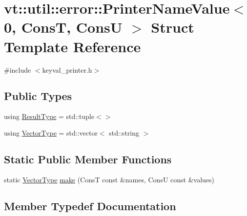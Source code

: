 \hypertarget{structvt_1_1util_1_1error_1_1_printer_name_value_3_010_00_01_cons_t_00_01_cons_u_01_4}{}\section{vt\+:\+:util\+:\+:error\+:\+:Printer\+Name\+Value$<$ 0, ConsT, ConsU $>$ Struct Template Reference}
\label{structvt_1_1util_1_1error_1_1_printer_name_value_3_010_00_01_cons_t_00_01_cons_u_01_4}


{\ttfamily \#include $<$keyval\+\_\+printer.\+h$>$}

\subsection*{Public Types}
\begin{DoxyCompactItemize}
\item 
using \hyperlink{structvt_1_1util_1_1error_1_1_printer_name_value_3_010_00_01_cons_t_00_01_cons_u_01_4_a39a8221374942d5d98a1f062072755ae}{Result\+Type} = std\+::tuple$<$$>$
\item 
using \hyperlink{structvt_1_1util_1_1error_1_1_printer_name_value_3_010_00_01_cons_t_00_01_cons_u_01_4_a1578540c95029bb5f6a8345efe655486}{Vector\+Type} = std\+::vector$<$ std\+::string $>$
\end{DoxyCompactItemize}
\subsection*{Static Public Member Functions}
\begin{DoxyCompactItemize}
\item 
static \hyperlink{structvt_1_1util_1_1error_1_1_printer_name_value_3_010_00_01_cons_t_00_01_cons_u_01_4_a1578540c95029bb5f6a8345efe655486}{Vector\+Type} \hyperlink{structvt_1_1util_1_1error_1_1_printer_name_value_3_010_00_01_cons_t_00_01_cons_u_01_4_a05fa4e230882589626596a4b45472af8}{make} (ConsT const \&names, ConsU const \&values)
\end{DoxyCompactItemize}


\subsection{Member Typedef Documentation}
\mbox{\label{structvt_1_1util_1_1error_1_1_printer_name_value_3_010_00_01_cons_t_00_01_cons_u_01_4_a39a8221374942d5d98a1f062072755ae}} 
